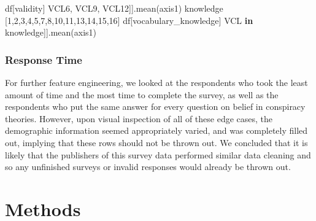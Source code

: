 \documentclass{article}[11pt]
\newenvironment{Shaded}{}{}
\newcommand{\KeywordTok}[1]{\textcolor[rgb]{0.00,0.44,0.13}{\textbf{{#1}}}}
\newcommand{\DecValTok}[1]{\textcolor[rgb]{0.25,0.63,0.44}{{#1}}}
\newcommand{\StringTok}[1]{\textcolor[rgb]{0.25,0.44,0.63}{{#1}}}
\newcommand{\NormalTok}[1]{{#1}}
\begin{document}
\begin{Shaded}
\begin{Highlighting}[]
\NormalTok{df[}\StringTok{\textquotesingle{}validity\textquotesingle{}}\NormalTok{] }\OperatorTok{=}\NormalTok{ df[[}\StringTok{\textquotesingle{}VCL6\textquotesingle{}}\NormalTok{, }\StringTok{\textquotesingle{}VCL9\textquotesingle{}}\NormalTok{, }\StringTok{\textquotesingle{}VCL12\textquotesingle{}}\NormalTok{]].mean(axis}\OperatorTok{=}\DecValTok{1}\NormalTok{)}
knowledge \OperatorTok{=} [1,2,3,4,5,7,8,10,11,13,14,15,16]
\NormalTok{df[}\StringTok{\textquotesingle{}vocabulary\_knowledge\textquotesingle{}}\NormalTok{] }\OperatorTok{=}\NormalTok{ df[[}\StringTok{\textquotesingle{}VCL\textquotesingle{}} \OperatorTok{+} \BuiltInTok{str}\NormalTok{(i) }\ControlFlowTok{for}\NormalTok{ i }\KeywordTok{in}\NormalTok{ knowledge]].mean(axis}\OperatorTok{=}\DecValTok{1}\NormalTok{)}
\end{Highlighting}
\end{Shaded}

\hypertarget{time-feature-engineered}{%
\subsubsection*{Response Time}\label{time-feature-engineered}}

For further feature engineering, we looked at the respondents who took
the least amount of time and the most time to complete the survey, as
well as the respondents who put the same answer for every question on
belief in conspiracy theories. However, upon visual inspection of all of
these edge cases, the demographic information seemed appropriately
varied, and was completely filled out, implying that these rows should
not be thrown out. We concluded that it is likely that the publishers of
this survey data performed similar data cleaning and so any unfinished
surveys or invalid responses would already be thrown out.

\hypertarget{methods}{%
\section*{Methods}\label{methods}}
\end{document}
